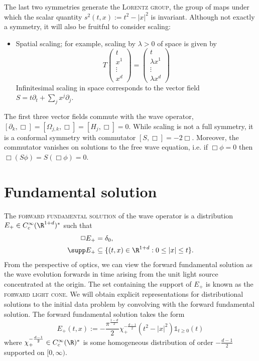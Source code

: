 \documentclass[reqno]{amsart}
\theoremstyle{definition}
\theoremstyle{remark}
\newcounter{problem}[section]	\declaretheorem[style=thmrecbox,name=Problem, numberlike=problem]{statement}
\renewcommand{\emph}{\textsc}
\begin{document}
The last two symmetries generate the \emph{Lorentz group}, the group of maps under which the scalar quantity $s^2 (t, x) := t^2 - |x|^2$ is invariant. Although not exactly a symmetry, it will also be fruitful to consider scaling:
\begin{itemize}
	\item Spatial scaling; for example, scaling by $\lambda > 0$ of space is given by 
				\[
					T
					\begin{pmatrix}
						t \\ x^1 \\ \vdots \\ x^d
					\end{pmatrix}
					=
					\begin{pmatrix}
						t \\ \lambda x^1\\ \vdots \\ \lambda x^d
					\end{pmatrix}
				\]
			Infinitesimal scaling in space corresponds to the vector field $S = t \partial_t + \sum_j x^j \partial_j$. 		 
\end{itemize}
The first three vector fields commute with the wave operator, $[\partial_k, \Box] = [\Omega_{j, k}, \Box] = [H_j, \Box] = 0$. While scaling is not a full symmetry, it is a conformal symmetry with commutator $[S, \Box] = -2 \Box$. Moreover, the commutator vanishes on solutions to the free wave equation, i.e. if $\Box \phi = 0$ then $\Box (S \phi) = S(\Box \phi) = 0$. 

\section{Fundamental solution}

The \emph{forward fundamental solution} of the wave operator is a distribution $E_+ \in C^\infty_c (\R^{1 + d})^*$ such that 
	\begin{align*}
			\Box E_+
				&= \delta_0, \\
			\supp E_+
				&\subseteq \{ (t, x) \in \R^{1 + d} : 0 \leq |x| \leq t \}.	
	\end{align*}
From the perspective of optics, we can view the forward fundamental solution as the wave evolution forwards in time arising from the unit light source concentrated at the origin. The set containing the support of $E_+$ is known as the \emph{forward light cone}. We will obtain explicit representations for distributional solutions to the initial data problem by convolving with the forward fundamental solution. The forward fundamental solution takes the form
	\[ E_+ (t, x) := -\frac{\pi^{\frac{1 - d}{2}}}{2}  \chi_+^{-\frac{d - 1}{2}} (t^2 - |x|^2) \mathbb 1_{t \geq 0} (t) \]
where $\chi_+^{-\frac{d - 1}{2}} \in C^\infty_c (\R)^*$ is some homogeneous distribution of order $-\tfrac{d - 1}{2}$ supported on $[0, \infty)$. 
\end{document}
